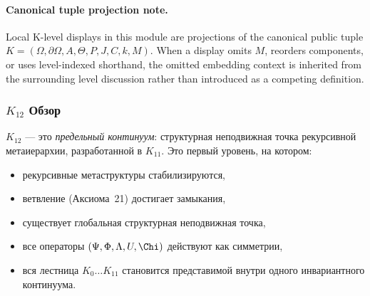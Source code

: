 



\paragraph{Canonical tuple projection note.}
Local K-level displays in this module are projections of the canonical public tuple \(K=(\Omega,\partial\Omega,A,\Theta,P,J,C,k,M)\). When a display omits \(M\), reorders components, or uses level-indexed shorthand, the omitted embedding context is inherited from the surrounding level discussion rather than introduced as a competing definition.

\subsubsection{$K_{12}$ Обзор}
\label{sec:k12-overview}

$K_{12}$ — это \emph{предельный континуум}: структурная неподвижная точка
рекурсивной метаиерархии, разработанной в $K_{11}$.
Это первый уровень, на котором:

\begin{itemize}
    \item рекурсивные метаструктуры стабилизируются,
    \item ветвление (Аксиома~21) достигает замыкания,
    \item существует глобальная структурная неподвижная точка,
    \item все операторы $(\Psi,\Phi,\Lambda,U,\Chi)$ действуют как симметрии,
    \item вся лестница $K_0\dots K_{11}$ становится представимой внутри одного
          инвариантного континуума.
\end{itemize}

